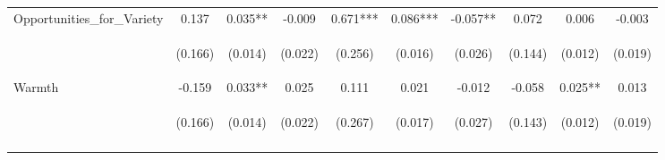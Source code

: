 \begin{tabular}{lccccccccc}
\noalign{\smallskip}Opportunities_for_Variety & 0.137 & 0.035** & -0.009 & 0.671*** & 0.086*** & -0.057** & 0.072 & 0.006 & -0.003\\
 & \begin{footnotesize}(0.166)\end{footnotesize} & \begin{footnotesize}(0.014)\end{footnotesize} & \begin{footnotesize}(0.022)\end{footnotesize} & \begin{footnotesize}(0.256)\end{footnotesize} & \begin{footnotesize}(0.016)\end{footnotesize} & \begin{footnotesize}(0.026)\end{footnotesize} & \begin{footnotesize}(0.144)\end{footnotesize} & \begin{footnotesize}(0.012)\end{footnotesize} & \begin{footnotesize}(0.019)\end{footnotesize}\\
\noalign{\smallskip}Warmth & -0.159 & 0.033** & 0.025 & 0.111 & 0.021 & -0.012 & -0.058 & 0.025** & 0.013\\
 & \begin{footnotesize}(0.166)\end{footnotesize} & \begin{footnotesize}(0.014)\end{footnotesize} & \begin{footnotesize}(0.022)\end{footnotesize} & \begin{footnotesize}(0.267)\end{footnotesize} & \begin{footnotesize}(0.017)\end{footnotesize} & \begin{footnotesize}(0.027)\end{footnotesize} & \begin{footnotesize}(0.143)\end{footnotesize} & \begin{footnotesize}(0.012)\end{footnotesize} & \begin{footnotesize}(0.019)\end{footnotesize}\\
\noalign{\smallskip}\hline\end{tabular}\\

